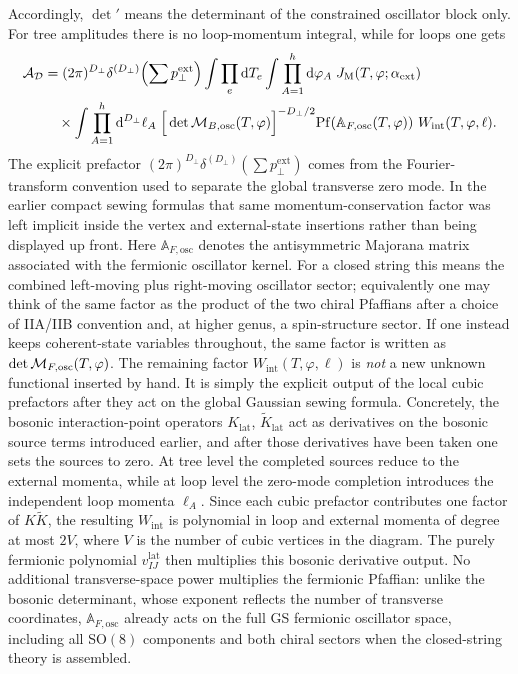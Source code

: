 \documentclass[11pt]{article}
\numberwithin{equation}{section}
\newcommand{\perpD}{D_\perp}
\newcommand{\dd}{\mathrm{d}}
\begin{document}
Accordingly, $\det{}'$ means the determinant of the constrained oscillator block only. For tree amplitudes there is no loop-momentum integral, while for loops one gets
\begin{equation}
\label{eq:s17-003}
\begin{aligned}
{\cal A}_{\cal D}
&=(2\pi)^{\perpD}\delta^{(\perpD)}\!\left(\sum p_{\perp}^{\mathrm{ext}}\right)
\int \prod_e \dd T_e
\int \prod_{A=1}^{h}\dd\varphi_A\;
J_{\mathrm{M}}(T,\varphi;\alpha_{\mathrm{ext}})\\
&\quad\times
\int \prod_{A=1}^{h}\dd^{\perpD}\ell_A\;
\Big[\det {\cal M}_{B,\mathrm{osc}}(T,\varphi)\Big]^{-\perpD/2}
\mathrm{Pf}\!\left(\mathbb A_{F,\mathrm{osc}}(T,\varphi)\right)\,
W_{\mathrm{int}}(T,\varphi,\ell).
\end{aligned}
\end{equation}
The explicit prefactor $(2\pi)^{\perpD}\delta^{(\perpD)}(\sum p_\perp^{\mathrm{ext}})$ comes from the Fourier-transform convention used to separate the global transverse zero mode. In the earlier compact sewing formulas that same momentum-conservation factor was left implicit inside the vertex and external-state insertions rather than being displayed up front.
Here $\mathbb A_{F,\mathrm{osc}}$ denotes the antisymmetric Majorana matrix associated with the fermionic oscillator kernel. For a closed string this means the combined left-moving plus right-moving oscillator sector; equivalently one may think of the same factor as the product of the two chiral Pfaffians after a choice of IIA/IIB convention and, at higher genus, a spin-structure sector. If one instead keeps coherent-state variables throughout, the same factor is written as $\det {\cal M}_{F,\mathrm{osc}}(T,\varphi)$. The remaining factor $W_{\mathrm{int}}(T,\varphi,\ell)$ is \emph{not} a new unknown functional inserted by hand. It is simply the explicit output of the local cubic prefactors after they act on the global Gaussian sewing formula. Concretely, the bosonic interaction-point operators $K_{\mathrm{lat}}$, $\widetilde K_{\mathrm{lat}}$ act as derivatives on the bosonic source terms introduced earlier, and after those derivatives have been taken one sets the sources to zero. At tree level the completed sources reduce to the external momenta, while at loop level the zero-mode completion introduces the independent loop momenta $\ell_A$. Since each cubic prefactor contributes one factor of $K\widetilde K$, the resulting $W_{\mathrm{int}}$ is polynomial in loop and external momenta of degree at most $2V$, where $V$ is the number of cubic vertices in the diagram. The purely fermionic polynomial $v_{IJ}^{\mathrm{lat}}$ then multiplies this bosonic derivative output.
No additional transverse-space power multiplies the fermionic Pfaffian: unlike the bosonic determinant, whose exponent reflects the number of transverse coordinates, $\mathbb A_{F,\mathrm{osc}}$ already acts on the full GS fermionic oscillator space, including all SO$(8)$ components and both chiral sectors when the closed-string theory is assembled.
\end{document}
